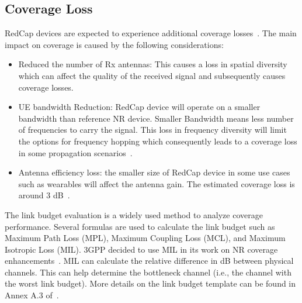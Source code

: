 \documentclass[]{IEEEtran}
\begin{document}
\subsection{Coverage Loss}
\label{sec:6-1}


RedCap devices are expected to experience additional coverage losses~\cite{moloudi_coverage_2021}.
The main impact on coverage is caused by the following considerations:
\begin{itemize}
    \item Reduced the number of Rx antennas: This causes a loss in spatial diversity which can affect the quality of the received signal and subsequently causes coverage losses. 
    \item UE bandwidth Reduction: RedCap device will operate on a smaller bandwidth than reference NR device.
    Smaller Bandwidth means less number of frequencies to carry the signal.
    This loss in frequency diversity will limit the options for frequency hopping which consequently leads to a coverage loss in some propagation scenarios~\cite{ratasuk_reduced_2021}.
    \item Antenna efficiency loss: the smaller size of RedCap device in some use cases such as wearables will affect the antenna gain. The estimated coverage loss is around 3 dB~\cite{3gpp_study_2021_38.875}.
\end{itemize}

The link budget evaluation is a widely used method to analyze coverage performance.
Several formulas are used to calculate the link budget such as Maximum Path Loss (MPL), Maximum Coupling Loss (MCL), and Maximum Isotropic Loss (MIL).
3GPP decided to use MIL in its work on NR coverage enhancements~\cite{3gpp_study_nodate-3_38.830}.
MIL can calculate the relative difference in dB between physical channels.
This can help determine the bottleneck channel (i.e., the channel with the worst link budget).
More details on the link budget template can be found in Annex A.3 of~\cite{3gpp_study_nodate-3_38.830}. 
\end{document}
